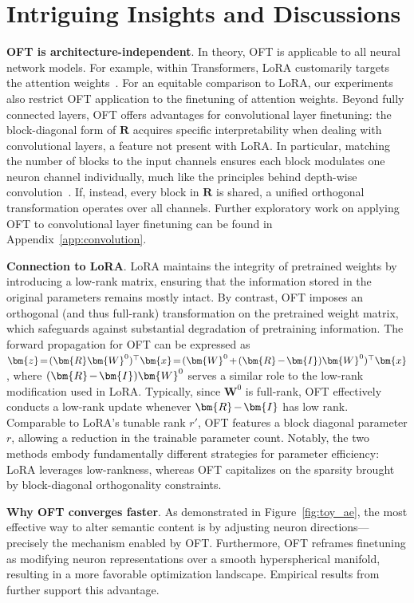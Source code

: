 \section{Intriguing Insights and Discussions}

\textbf{OFT is architecture-independent}. In theory, OFT is applicable to all neural network models. For example, within Transformers, LoRA customarily targets the attention weights~\cite{hulora2022}. For an equitable comparison to LoRA, our experiments also restrict OFT application to the finetuning of attention weights. Beyond fully connected layers, OFT offers advantages for convolutional layer finetuning: the block-diagonal form of $\bm{R}$ acquires specific interpretability when dealing with convolutional layers, a feature not present with LoRA. In particular, matching the number of blocks to the input channels ensures each block modulates one neuron channel individually, much like the principles behind depth-wise convolution~\cite{chollet2017xception}. If, instead, every block in $\bm{R}$ is shared, a unified orthogonal transformation operates over all channels. Further exploratory work on applying OFT to convolutional layer finetuning can be found in Appendix~\ref{app:convolution}.

\textbf{Connection to LoRA}. LoRA maintains the integrity of pretrained weights by introducing a low-rank matrix, ensuring that the information stored in the original parameters remains mostly intact. By contrast, OFT imposes an orthogonal (and thus full-rank) transformation on the pretrained weight matrix, which safeguards against substantial degradation of pretraining information. The forward propagation for OFT can be expressed as $\thickmuskip=2mu \medmuskip=2mu \bm{z}=(\bm{R}\bm{W}^0)^\top\bm{x}=(\bm{W}^0+(\bm{R}-\bm{I})\bm{W}^0)^\top\bm{x}$, where $\thickmuskip=2mu \medmuskip=2mu (\bm{R}-\bm{I})\bm{W}^0$ serves a similar role to the low-rank modification used in LoRA. Typically, since $\bm{W}^0$ is full-rank, OFT effectively conducts a low-rank update whenever $\thickmuskip=2mu \medmuskip=2mu \bm{R}-\bm{I}$ has low rank. Comparable to LoRA’s tunable rank $r'$, OFT features a block diagonal parameter $r$, allowing a reduction in the trainable parameter count. Notably, the two methods embody fundamentally different strategies for parameter efficiency: LoRA leverages low-rankness, whereas OFT capitalizes on the sparsity brought by block-diagonal orthogonality constraints.

\textbf{Why OFT converges faster}. As demonstrated in Figure~\ref{fig:toy_ae}, the most effective way to alter semantic content is by adjusting neuron directions—precisely the mechanism enabled by OFT. Furthermore, OFT reframes finetuning as modifying neuron representations over a smooth hyperspherical manifold, resulting in a more favorable optimization landscape. Empirical results from \cite{liu2021orthogonal} further support this advantage.

